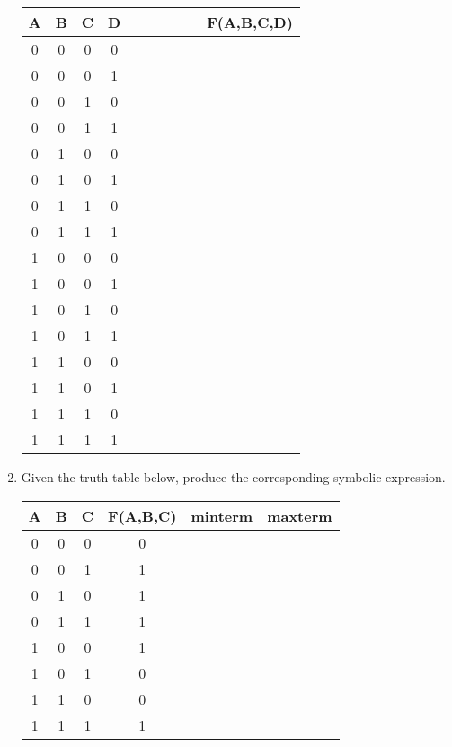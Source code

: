 \begin{enumerate}
        \begin{tabular}{c|c|c|c||p{0.1in}|p{0.2in}|p{0.2in}|p{0.2in}|p{0.2in}||c}
            A & B & C & D &   &    &  &  &  & F(A,B,C,D) \\ \hline \hline
            0 & 0 & 0 & 0 &   &    &  &  &  &   \\ \hline
            0 & 0 & 0 & 1 &   &    &  &  &  &   \\ \hline
            0 & 0 & 1 & 0 &   &    &  &  &  &   \\ \hline
            0 & 0 & 1 & 1 &   &    &  &  &  &   \\ \hline
            0 & 1 & 0 & 0 &   &    &  &  &  &   \\ \hline
            0 & 1 & 0 & 1 &   &    &  &  &  &   \\ \hline
            0 & 1 & 1 & 0 &   &    &  &  &  &   \\ \hline
            0 & 1 & 1 & 1 &   &    &  &  &  &   \\ \hline
            1 & 0 & 0 & 0 &   &    &  &  &  &   \\ \hline
            1 & 0 & 0 & 1 &   &    &  &  &  &   \\ \hline
            1 & 0 & 1 & 0 &   &    &  &  &  &   \\ \hline
            1 & 0 & 1 & 1 &   &    &  &  &  &   \\ \hline
            1 & 1 & 0 & 0 &   &    &  &  &  &   \\ \hline
            1 & 1 & 0 & 1 &   &    &  &  &  &   \\ \hline
            1 & 1 & 1 & 0 &   &    &  &  &  &   \\ \hline
            1 & 1 & 1 & 1 &   &    &  &  &  &   \\
        \end{tabular}

    \item Given the truth table below, produce the corresponding symbolic expression.

        \begin{tabular}{c|c|c||c|c|c}
            A & B & C & F(A,B,C)    & minterm & maxterm    \\ \hline
            0 & 0 & 0 & 0        &        &     \\ \hline
            0 & 0 & 1 & 1        &         &    \\ \hline
            0 & 1 & 0 & 1        &         &    \\ \hline
            0 & 1 & 1 & 1        &         &    \\ \hline
            1 & 0 & 0 & 1        &         &    \\ \hline
            1 & 0 & 1 & 0        &         &    \\ \hline
            1 & 1 & 0 & 0        &         &    \\ \hline
            1 & 1 & 1 & 1        &         &    \\
        \end{tabular}
        \vspace{1cm}


\end{enumerate}
